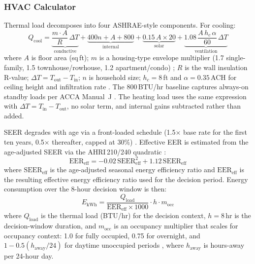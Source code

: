 \documentclass[final,3p,times]{elsarticle}
\begin{document}
\subsubsection{HVAC Calculator}
Thermal load decomposes into four ASHRAE-style components. For cooling:
\begin{equation}
  Q_{\mathrm{cool}} =
    \underbrace{\frac{m \cdot A}{R}\,\Delta T}_{\text{conductive}}
    +\underbrace{400n + A + 800}_{\text{internal}}
    +\underbrace{0.15\,A \times 20}_{\text{solar}}
    +\underbrace{1.08\,\frac{A\, h_c\, \alpha}{60}\,\Delta T}_{\text{ventilation}}
  \label{eq:hvac_cooling_load}
\end{equation}
\noindent where $A$ is floor area (sq\,ft); $m$ is a housing-type envelope multiplier
(1.7 single-family, 1.5 townhouse/rowhouse, 1.2 apartment/condo) \cite{polly2011};
$R$ is the wall insulation R-value; $\Delta T = T_{\mathrm{out}} - T_{\mathrm{in}}$;
$n$ is household size; $h_c = 8$\,ft and $\alpha = 0.35$\,ACH for ceiling height and
infiltration rate \cite{polly2011}. The 800\,BTU/hr baseline captures
always-on standby loads per ACCA Manual~J \cite{polly2011}. The heating load uses the
same expression with $\Delta T = T_{\mathrm{in}} - T_{\mathrm{out}}$, no solar term, and
internal gains subtracted rather than added.

SEER degrades with age via a front-loaded schedule (1.5$\times$ base rate for the first
ten years, 0.5$\times$ thereafter, capped at 30\%) \cite{domanski2014,davis2010,fenaughty2018}.
Effective EER is estimated from the age-adjusted SEER via the AHRI\,210/240 quadratic
\cite{ahri2008}:
\begin{equation}
  \mathrm{EER}_{\mathrm{eff}} =
    -0.02\,\mathrm{SEER}_{\mathrm{eff}}^{2} + 1.12\,\mathrm{SEER}_{\mathrm{eff}}
  \label{eq:eer_quadratic}
\end{equation}
\noindent where $\mathrm{SEER}_{\mathrm{eff}}$ is the age-adjusted seasonal energy efficiency ratio
and $\mathrm{EER}_{\mathrm{eff}}$ is the resulting effective energy efficiency ratio used for the decision period.
Energy consumption over the 8-hour decision window is then:
\begin{equation}
  E_{\mathrm{kWh}} =
    \frac{Q_{\mathrm{load}}}{\mathrm{EER}_{\mathrm{eff}} \times 1000}
    \cdot h \cdot m_{\mathrm{occ}}
  \label{eq:hvac_energy}
\end{equation}
\noindent where $Q_{\mathrm{load}}$ is the thermal load (BTU/hr) for the decision context,
$h = 8$\,hr is the decision-window duration, and $m_{\mathrm{occ}}$ is an occupancy multiplier
that scales for occupancy context: 1.0 for fully occupied, 0.75 for overnight, and
$1 - 0.5(h_{\mathrm{away}}/24)$ for daytime unoccupied periods \cite{houde2021}, where
$h_{\mathrm{away}}$ is hours-away per 24-hour day.
\end{document}
